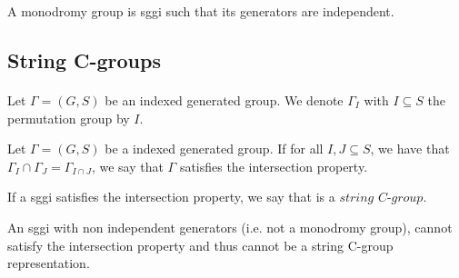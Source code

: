 \begin{definition}
  A monodromy group is sggi such that its generators are independent.
\end{definition}

\subsection{String C-groups}

\paragraph{}
Let $\Gamma = (G,S)$ be an indexed generated group. We denote $\Gamma_I$ with $I \subseteq S$ the permutation group by $I$.

\begin{definition}
  Let $\Gamma = (G,S)$ be a indexed generated group. If for all $I, J \subseteq S$, we have that $\Gamma_I \cap \Gamma_J = \Gamma_{I \cap J}$, we say that $\Gamma$ satisfies the intersection property.
\end{definition}

\begin{definition}
  If a sggi satisfies the intersection property, we say that is a $\textit{string C-group}$.
\end{definition}

\begin{property}
  \label{not-monodromy-intersection}
  An sggi with non independent generators (i.e. not a monodromy group), cannot satisfy the intersection property and thus cannot be a string C-group representation.
\end{property}
